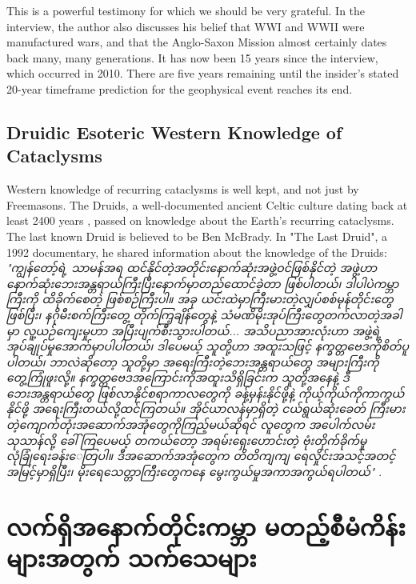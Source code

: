 \documentclass[10pt,twocolumn,letterpaper]{article}
\begin{document}
This is a powerful testimony for which we should be very grateful. In the interview, the author also discusses his belief that WWI and WWII were manufactured wars, and that the Anglo-Saxon Mission almost certainly dates back many, many generations. It has now been 15 years since the interview, which occurred in 2010. There are five years remaining until the insider's stated 20-year timeframe prediction for the geophysical event reaches its end.

\subsection{Druidic Esoteric Western Knowledge of Cataclysms}

Western knowledge of recurring cataclysms is well kept, and not just by Freemasons. The Druids, a well-documented ancient Celtic culture dating back at least 2400 years \cite{7}, passed on knowledge about the Earth's recurring cataclysms. The last known Druid is believed to be Ben McBrady. In "The Last Druid", a 1992 documentary, he shared information about the knowledge of the Druids: \textit{"ကျွန်တော့်ရဲ့ သာမန်အရ ထင်နိုင်တဲ့အတိုင်းနောက်ဆုံးအဖွဲ့ဝင်ဖြစ်နိုင်တဲ့ အဖွဲ့ဟာ နောက်ဆုံးဘေးအန္တရာယ်ကြီးပြီးနောက်မှာတည်ထောင်ခဲ့တာ ဖြစ်ပါတယ်၊ ဒါပါပဲကမ္ဘာကြီးကို ထိခိုက်စေတဲ့ ဖြစ်စဉ်ကြီးပါ။ အခု ယင်းထဲမှာကြီးမားတဲ့လျှပ်စစ်မုန်တိုင်းတွေဖြစ်ပြီး၊ နဂိုမီးစက်ကြီးတွေ့ တိုက်ကြ့ချိန်တွေနဲ့ သံမဏိမိုးအုပ်ကြီးတွေတက်လာတဲ့အခါမှာ လူ့ယဉ်ကျေးမှုဟာ အပြီးပျက်စီးသွားပါတယ်... အသိပညာအားလုံးဟာ အဖွဲ့ရဲ့အုပ်ချုပ်မှုအောက်မှာပါပါတယ်၊ ဒါပေမယ့် သူတို့ဟာ အထူးသဖြင့် နက္ခတ္တဗေဒကိုစိတ်ပူပါတယ်၊ ဘာလဲဆိုတော့ သူတို့မှာ အရေးကြီးတဲ့ဘေးအန္တရာယ်တွေ အများကြီးကိုတွေ့ကြုံဖူးလို့။ နက္ခတ္တဗေဒအကြောင်းကိုအထူးသိရှိခြင်းက သူတို့အနေနဲ့ ဒီဘေးအန္တရာယ်တွေ ဖြစ်လာနိုင်စရာကာလတွေကို ခန့်မှန်းနိုင်ဖို့နဲ့ ကိုယ့်ကိုယ်ကိုကာကွယ်နိုင်ဖို့ အရေးကြီးတယ်လို့ထင်ကြတယ်။ အိုင်ယာလန်မှာရှိတဲ့ ငယ်ရွယ်ဆုံးခေတ် ကြီးမားတဲ့ကျောက်တုံးအဆောက်အအုံတွေကိုကြည့်မယ်ဆိုရင် လူတွေက အပေါက်လမ်းသုသာန်လို့ ခေါ်ကြပေမယ့် တကယ်တော့ အရမ်းရှေးဟောင်းတဲ့ ဗုံးတိုက်ခိုက်မှုလုံခြုံရေးခန်းေတြပါ။ ဒီအဆောက်အအုံတွေက တိတိကျကျ ရေလှိုင်းအသင့်အတင့် အမြင့်မှာရှိပြီး၊ မိုးရေသေတ္တာကြီးတွေကနေ မွေးကွယ်မှုအကာအကွယ်ရပါတယ်"} \cite{8,9}.

\section{လက်ရှိအနောက်တိုင်းကမ္ဘာ မတည့်စီမံကိန်းများအတွက် သက်သေများ}
\end{document}
